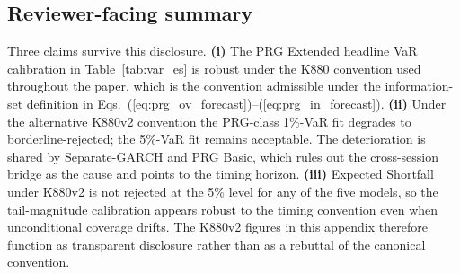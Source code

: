 \documentclass[11pt,a4paper]{article}
\begin{document}
\subsection*{Reviewer-facing summary}

Three claims survive this disclosure. \textbf{(i)} The PRG Extended
headline VaR calibration in Table~\ref{tab:var_es} is robust under the
K880 convention used throughout the paper, which is the convention
admissible under the information-set definition in
Eqs.~(\ref{eq:prg_ov_forecast})--(\ref{eq:prg_in_forecast}).
\textbf{(ii)} Under the alternative K880v2 convention the PRG-class
1\%-VaR fit degrades to borderline-rejected; the 5\%-VaR fit remains
acceptable. The deterioration is shared by Separate-GARCH and PRG Basic,
which rules out the cross-session bridge as the cause and points to the
timing horizon. \textbf{(iii)} Expected Shortfall under K880v2 is not
rejected at the 5\% level for any of the five models, so the
tail-magnitude calibration appears robust to the timing convention even
when unconditional coverage drifts. The K880v2 figures in this appendix
therefore function as transparent disclosure rather than as a rebuttal
of the canonical convention.


\end{document}
